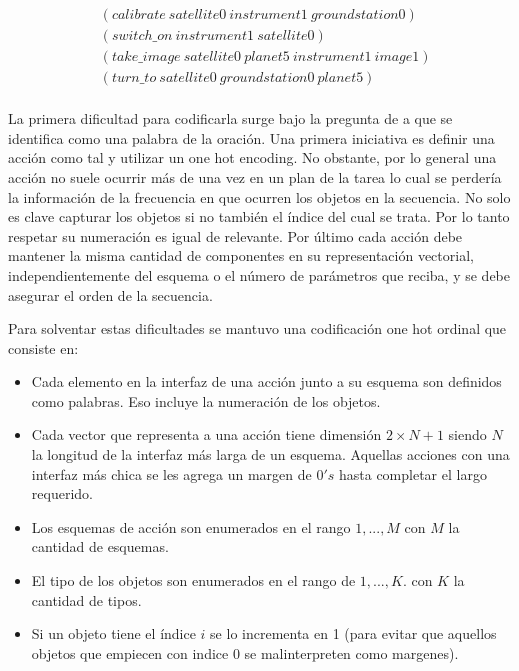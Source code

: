 \begin{align*}
    & (calibrate\ satellite0\ instrument1\ groundstation0) \\
    & (switch\_on\ instrument1\ satellite0) \\
    & (take\_image\ satellite0\ planet5\ instrument1\ image1) \\
    & (turn\_to\ satellite0\ groundstation0\ planet5) \\
\end{align*}

La primera dificultad para codificarla surge bajo la pregunta de a que se
identifica como una palabra de la oración. Una primera iniciativa es definir una
acción como tal y utilizar un one hot encoding. No obstante, por lo general
una acción no suele ocurrir más de una vez en un plan de la tarea lo cual se
perdería la información de la frecuencia en que ocurren los objetos en la
secuencia. No solo es clave capturar los objetos si no también el índice del
cual se trata. Por lo tanto respetar su numeración es igual de relevante. Por
último cada acción debe mantener la misma cantidad de componentes en su
representación vectorial, independientemente del esquema o el número de
parámetros que reciba, y se debe asegurar el orden de la secuencia.

Para solventar estas dificultades se mantuvo una codificación one hot ordinal que
consiste en:

\begin{itemize}
    \item Cada elemento en la interfaz de una acción junto a su esquema son
    definidos como palabras. Eso incluye la numeración de los objetos.
    \item Cada vector que representa a una acción tiene dimensión $2 \times N +
    1$ siendo $N$ la longitud de la interfaz más larga de un esquema. Aquellas
    acciones con una interfaz más chica se les agrega un margen de $0's$ hasta
    completar el largo requerido.
    \item Los esquemas de acción son enumerados en el rango $1, ..., M$ con $M$
    la cantidad de esquemas.
    \item El tipo de los objetos son enumerados en el rango de $1, ..., K$. con
    $K$ la cantidad de tipos.
    \item Si un objeto tiene el índice $i$ se lo incrementa en 1 (para evitar que
    aquellos objetos que empiecen con indice 0 se malinterpreten como margenes).
\end{itemize}


